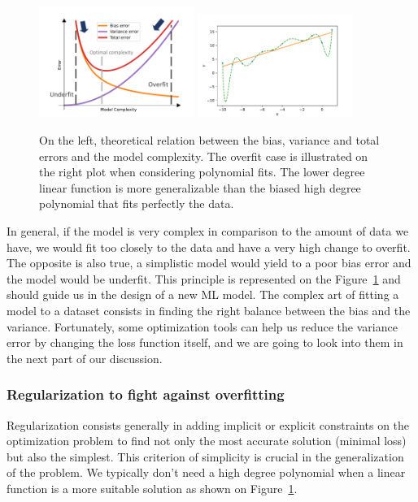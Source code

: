 \documentclass[main]{subfiles}
\begin{document}
\begin{figure}[ht]
  \centering
    \includegraphics[width=0.45\textwidth]{figures/4-ml/Bias_variance_tradeoff.pdf}
    \includegraphics[width=0.45\textwidth]{figures/4-ml/overfit.pdf}
    \caption{On the left, theoretical relation between the bias, variance and total errors and the model complexity. The overfit case is illustrated on the right plot when considering polynomial fits. The lower degree linear function is more generalizable than the biased high degree polynomial that fits perfectly the data.}\label{fgr:bias_variance}
\end{figure}

In general, if the model is very complex in comparison to the amount of data we have, we would fit too closely to the data and have a very high change to overfit. The opposite is also true, a simplistic model would yield to a poor bias error and the model would be underfit. This principle is represented on the Figure~\ref{fgr:bias_variance} and should guide us in the design of a new ML model.
The complex art of fitting a model to a dataset consists in finding the right balance between the bias and the variance. Fortunately, some optimization tools can help us reduce the variance error by changing the loss function itself, and we are going to look into them in the next part of our discussion.

\subsubsection{Regularization to fight against overfitting}

Regularization consists generally in adding implicit or explicit constraints on the optimization problem to find not only the most accurate solution (minimal loss) but also the simplest. This criterion of simplicity is crucial in the generalization of the problem. We typically don't need a high degree polynomial when a linear function is a more suitable solution as shown on Figure~\ref{fgr:bias_variance}. 
\end{document}
